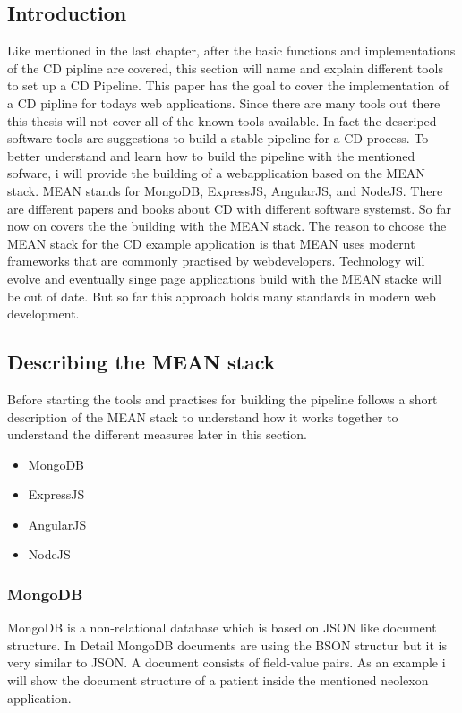 \subsection{Introduction}
Like mentioned in the last chapter, after the basic functions and implementations of the CD pipline are covered, this section will name and explain different tools
to set up a CD Pipeline. This paper has the goal to cover the implementation of a CD pipline for todays web applications. Since there are many tools out there
this thesis will not cover all of the known tools available. In fact the descriped software tools are suggestions to build a stable pipeline for a CD process.
To better understand and learn how to build the pipeline with the mentioned sofware, i will provide the building of a webapplication based on the
MEAN stack. MEAN stands for MongoDB, ExpressJS, AngularJS, and NodeJS. There are different papers and books about CD with different software systemst. So far
now on covers the the building with the MEAN stack.
The reason to choose the MEAN stack for the CD example application is that MEAN uses modernt frameworks that are commonly practised by webdevelopers. Technology
will evolve and eventually singe page applications build with the MEAN stacke will be out of date. But so far this approach holds many standards in modern web
development.

\subsection{Describing the MEAN stack}
Before starting the tools and practises for building the pipeline follows a short description of the MEAN stack to understand how it works together to understand
the different measures later in this section.

\begin{itemize}
  \item MongoDB
  \item ExpressJS
  \item AngularJS
  \item NodeJS
\end{itemize}

\subsubsection{MongoDB}
MongoDB is a non-relational database which is based on JSON like document structure. In Detail MongoDB documents are using the BSON structur but it is very
similar to JSON. A document consists of field-value pairs. As an example i will show the document structure of a patient inside the mentioned neolexon application.

